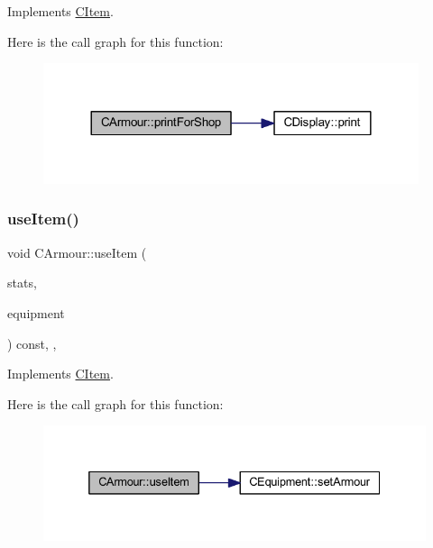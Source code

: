 Implements \mbox{\hyperlink{class_c_item_af56df4ab4d87984c56401231dd3492cf}{C\+Item}}.

Here is the call graph for this function\+:\nopagebreak
\begin{figure}[H]
\begin{center}
\leavevmode
\includegraphics[width=312pt]{class_c_armour_a3abc5a20200d572d920737aec75bb196_cgraph}
\end{center}
\end{figure}
\mbox{\label{class_c_armour_ab1000a6cfe419ca94b1254217fb707cd}} 
\subsubsection{\texorpdfstring{use\+Item()}{useItem()}}
{\footnotesize\ttfamily void C\+Armour\+::use\+Item (\begin{DoxyParamCaption}\item[{\mbox{\hyperlink{struct_hero_stats}{Hero\+Stats}} \&}]{stats,  }\item[{\mbox{\hyperlink{class_c_equipment}{C\+Equipment}} \&}]{equipment }\end{DoxyParamCaption}) const\hspace{0.3cm}{\ttfamily [inline]}, {\ttfamily [override]}, {\ttfamily [virtual]}}



Implements \mbox{\hyperlink{class_c_item_a30e8dd9608c78cd43e5c973bfe029baa}{C\+Item}}.

Here is the call graph for this function\+:\nopagebreak
\begin{figure}[H]
\begin{center}
\leavevmode
\includegraphics[width=332pt]{class_c_armour_ab1000a6cfe419ca94b1254217fb707cd_cgraph}
\end{center}
\end{figure}


